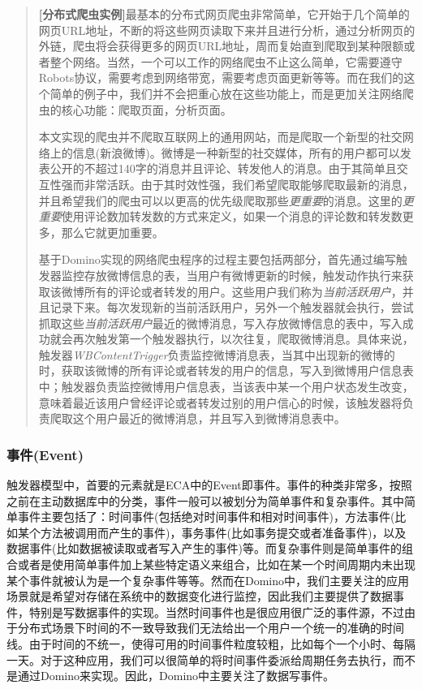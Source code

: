 \begin{quotation}
\textbf{[分布式爬虫实例]}最基本的分布式网页爬虫非常简单，它开始于几个简单的网页URL地址，不断的将这些网页读取下来并且进行分析，通过分析网页的外链，爬虫将会获得更多的网页URL地址，周而复始直到爬取到某种限额或者整个网络。当然，一个可以工作的网络爬虫不止这么简单，它需要遵守Robots协议，需要考虑到网络带宽，需要考虑页面更新等等。而在我们的这个简单的例子中，我们并不会把重心放在这些功能上，而是更加关注网络爬虫的核心功能：爬取页面，分析页面。

本文实现的爬虫并不爬取互联网上的通用网站，而是爬取一个新型的社交网络上的信息(新浪微博)。微博是一种新型的社交媒体，所有的用户都可以发表公开的不超过140字的消息并且评论、转发他人的消息。由于其简单且交互性强而非常活跃。由于其时效性强，我们希望爬取能够爬取最新的消息，并且希望我们的爬虫可以以更高的优先级爬取那些\textit{更重要}的消息。这里的\textit{更重要}使用评论数加转发数的方式来定义，如果一个消息的评论数和转发数更多，那么它就更加重要。

基于Domino实现的网络爬虫程序的过程主要包括两部分，首先通过编写触发器监控存放微博信息的表，当用户有微博更新的时候，触发动作执行来获取该微博所有的评论或者转发的用户。这些用户我们称为\textit{当前活跃用户}，并且记录下来。每次发现新的当前活跃用户，另外一个触发器就会执行，尝试抓取这些\textit{当前活跃用户}最近的微博消息，写入存放微博信息的表中，写入成功就会再次触发第一个触发器执行，以次往复，爬取微博消息。具体来说，触发器\textit{WBContentTrigger}负责监控微博消息表，当其中出现新的微博的时，获取该微博的所有评论或者转发的用户的信息，写入到微博用户信息表中；触发器负责监控微博用户信息表，当该表中某一个用户状态发生改变，意味着最近该用户曾经评论或者转发过别的用户信心的时候，该触发器将负责爬取这个用户最近的微博消息，并且写入到微博消息表中。
\end{quotation}

\subsubsection{事件(Event)}
触发器模型中，首要的元素就是ECA中的Event即事件。事件的种类非常多，按照之前在主动数据库中的分类，事件一般可以被划分为简单事件和复杂事件。其中简单事件主要包括了：时间事件(包括绝对时间事件和相对时间事件)，方法事件(比如某个方法被调用而产生的事件)，事务事件(比如事务提交或者准备事件)，以及数据事件(比如数据被读取或者写入产生的事件)等。而复杂事件则是简单事件的组合或者是使用简单事件加上某些特定语义来组合，比如在某一个时间周期内未出现某个事件就被认为是一个复杂事件等等。然而在Domino中，我们主要关注的应用场景就是希望对存储在系统中的数据变化进行监控，因此我们主要提供了数据事件，特别是写数据事件的实现。当然时间事件也是很应用很广泛的事件源，不过由于分布式场景下时间的不一致导致我们无法给出一个用户一个统一的准确的时间线。由于时间的不统一，使得可用的时间事件粒度较粗，比如每个一个小时、每隔一天。对于这种应用，我们可以很简单的将时间事件委派给周期任务去执行，而不是通过Domino来实现。因此，Domino中主要关注了数据写事件。

